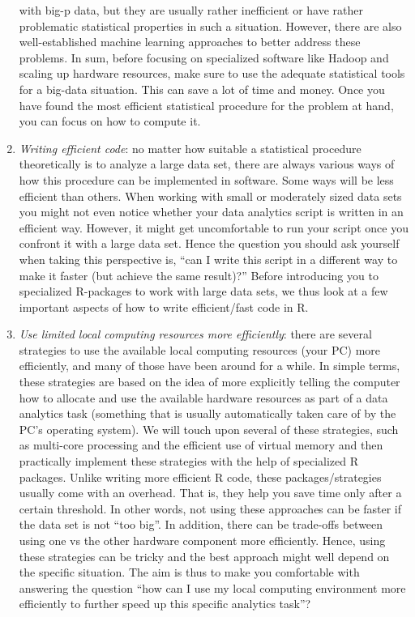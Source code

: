 \documentclass[
  12pt,
]{style/krantz}
\begin{document}
\begin{enumerate}
with big-p data, but they are usually rather inefficient or have rather problematic statistical properties in such a situation. However, there are also well-established machine learning approaches to better address these problems. In sum, before focusing on specialized software like Hadoop and scaling up hardware resources, make sure to use the adequate statistical tools for a big-data situation. This can save a lot of time and money. Once you have found the most efficient statistical procedure for the problem at hand, you can focus on how to compute it.
\item
  \emph{Writing efficient code}: no matter how suitable a statistical procedure theoretically is to analyze a large data set, there are always various ways of how this procedure can be implemented in software. Some ways will be less efficient than others. When working with small or moderately sized data sets you might not even notice whether your data analytics script is written in an efficient way. However, it might get uncomfortable to run your script once you confront it with a large data set. Hence the question you should ask yourself when taking this perspective is, ``can I write this script in a different way to make it faster (but achieve the same result)?'' Before introducing you to specialized R-packages to work with large data sets, we thus look at a few important aspects of how to write efficient/fast code in R.
\item
  \emph{Use limited local computing resources more efficiently}: there are several strategies to use the available local computing resources (your PC) more efficiently, and many of those have been around for a while. In simple terms, these strategies are based on the idea of more explicitly telling the computer how to allocate and use the available hardware resources as part of a data analytics task (something that is usually automatically taken care of by the PC's operating system). We will touch upon several of these strategies, such as multi-core processing and the efficient use of virtual memory and then practically implement these strategies with the help of specialized R packages. Unlike writing more efficient R code, these packages/strategies usually come with an overhead. That is, they help you save time only after a certain threshold. In other words, not using these approaches can be faster if the data set is not ``too big''. In addition, there can be trade-offs between using one vs the other hardware component more efficiently. Hence, using these strategies can be tricky and the best approach might well depend on the specific situation. The aim is thus to make you comfortable with answering the question ``how can I use my local computing environment more efficiently to further speed up this specific analytics task''?

\end{enumerate}
\end{document}
